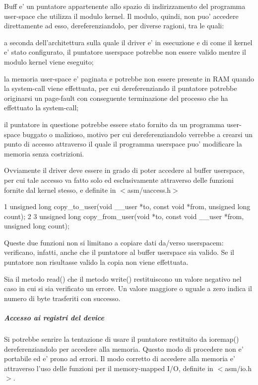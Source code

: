 Buff e' un puntatore appartenente allo spazio di indirizzamento del programma user-\/space che utilizza il modulo kernel. Il modulo, quindi, non puo' accedere direttamente ad esso, dereferenziandolo, per diverse ragioni, tra le quali\+:
\begin{DoxyItemize}
\item a seconda dell'architettura sulla quale il driver e' in esecuzione e di come il kernel e' stato configurato, il puntatore userspace potrebbe non essere valido mentre il modulo kernel viene eseguito;
\item la memoria user-\/space e' paginata e potrebbe non essere presente in R\+A\+M quando la system-\/call viene effettuata, per cui dereferenziando il puntatore potrebbe originarsi un page-\/fault con conseguente terminazione del processo che ha effettuato la system-\/call;
\item il puntatore in questione potrebbe essere stato fornito da un programma user-\/space buggato o malizioso, motivo per cui dereferenziandolo verrebbe a crearsi un punto di accesso attraverso il quale il programma userspace puo' modificare la memoria senza costrizioni.
\end{DoxyItemize}

Ovviamente il driver deve essere in grado di poter accedere al buffer userspace, per cui tale accesso va fatto solo ed esclusivamente attraverso delle funzioni fornite dal kernel stesso, e definite in $<$asm/uaccess.\+h$>$


\begin{DoxyCode}
1 unsigned long copy\_to\_user(void \_\_user *to, const void *from, unsigned long count);
2 
3 unsigned long copy\_from\_user(void *to, const void \_\_user *from, unsigned long count);
\end{DoxyCode}


Queste due funzioni non si limitano a copiare dati da/verso userspacem\+: verificano, infatti, anche che il puntatore al buffer userspace sia valido. Se il puntatore non risultasse valido la copia non viene effettuata.

Sia il metodo read() che il metodo write() restituiscono un valore negativo nel caso in cui si sia verificato un errore. Un valore maggiore o uguale a zero indica il numero di byte trasferiti con successo.

\subparagraph*{Accesso ai registri del device}

Si potrebbe senrire la tentazione di usare il puntatore restituito da ioremap() dereferenziandolo per accedere alla memoria. Questo modo di procedere non e' portabile ed e' prono ad errori. Il modo corretto di accedere alla memoria e' attraverso l'uso delle funzioni per il memory-\/mapped I/\+O, definite in $<$asm/io.\+h$>$.

